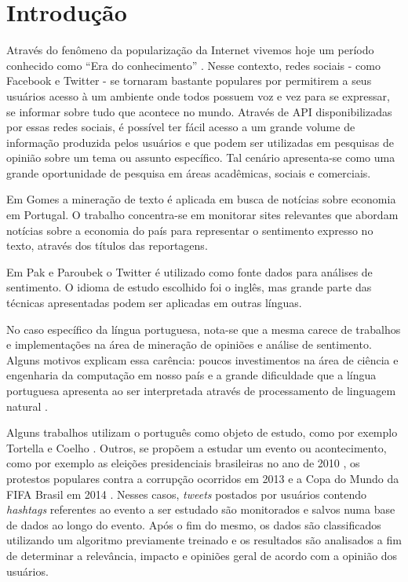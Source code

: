 \chapter{Introdução} \label{cap:1}

Através do fenômeno da popularização da Internet vivemos hoje um período conhecido como \enquote{Era do conhecimento} \cite{lastres1999informaccao}.
Nesse contexto, redes sociais - como Facebook e Twitter - se tornaram bastante populares por permitirem a seus usuários acesso à um ambiente onde todos possuem voz e vez para se expressar, se informar sobre tudo que acontece no mundo.
Através de \ac{API} disponibilizadas por essas redes sociais, é possível ter fácil acesso a um grande volume de informação produzida pelos usuários e que podem ser utilizadas em pesquisas de opinião sobre um tema ou assunto específico. Tal cenário apresenta-se como uma grande oportunidade de pesquisa em áreas acadêmicas, sociais e comerciais.

Em Gomes \cite{gomes2013text} a mineração de texto é aplicada em busca de notícias sobre economia em Portugal. O trabalho concentra-se em monitorar sites relevantes que abordam notícias sobre a economia do país para representar o sentimento expresso no texto, através dos títulos das reportagens.

Em Pak e Paroubek \cite{pak2010twitter} o Twitter é utilizado como fonte dados para análises de sentimento. O idioma de estudo escolhido foi o inglês, mas grande parte das técnicas apresentadas podem ser aplicadas em outras línguas.

No caso específico da língua portuguesa, nota-se que a mesma carece de trabalhos e implementações na área de mineração de opiniões e análise de sentimento. Alguns motivos explicam essa carência: poucos investimentos na área de ciência e engenharia da computação em nosso país e a grande dificuldade que a língua portuguesa apresenta ao ser interpretada através de processamento de linguagem natural \cite{santos2000projecto}.

Alguns trabalhos utilizam o português como objeto de estudo, como por exemplo Tortella e Coelho \cite{tortellaanalise}. Outros, se propõem a estudar um evento ou acontecimento, como por exemplo as eleições presidenciais brasileiras no ano de 2010 \cite{rodrigues2012characterizing}, os protestos populares contra a corrupção ocorridos em 2013 \cite{franca2014analise} e a Copa do Mundo da FIFA Brasil em 2014 \cite{carvalho2014mineraccao}. Nesses casos, \textit{tweets} postados por usuários contendo \textit{hashtags} referentes ao evento a ser estudado são monitorados e salvos numa base de dados ao longo do evento. Após o fim do mesmo, os dados são classificados utilizando um algoritmo previamente treinado e os resultados são analisados a fim de determinar a relevância, impacto e opiniões geral de acordo com a opinião dos usuários.

